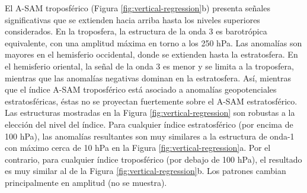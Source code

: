 \documentclass[12pt,oneside]{reedthesis}
\begin{document}
El A\nobreakdash-SAM troposférico (Figura \ref{fig:vertical-regression}b) presenta señales significativas que se extienden hacia arriba hasta los niveles superiores considerados.
En la troposfera, la estructura de la onda 3 es barotrópica equivalente, con una amplitud máxima en torno a los 250 hPa.
Las anomalías son mayores en el hemisferio occidental, donde se extienden hasta la estratosfera.
En el hemisferio oriental, la señal de la onda 3 es menor y se limita a la troposfera, mientras que las anomalías negativas dominan en la estratosfera.
Así, mientras que el índice A\nobreakdash-SAM troposférico está asociado a anomalías geopotenciales estratosféricas, éstas no se proyectan fuertemente sobre el A\nobreakdash-SAM estratosférico.
Las estructuras mostradas en la Figura \ref{fig:vertical-regression} son robustas a la elección del nivel del índice.
Para cualquier índice estratosférico (por encima de 100 hPa), las anomalías resultantes son muy similares a la estructura de onda-1 con máximo cerca de 10 hPa en la Figura \ref{fig:vertical-regression}a.
Por el contrario, para cualquier índice troposférico (por debajo de 100 hPa), el resultado es muy similar al de la Figura \ref{fig:vertical-regression}b.
Los patrones cambian principalmente en amplitud (no se muestra).
\end{document}
